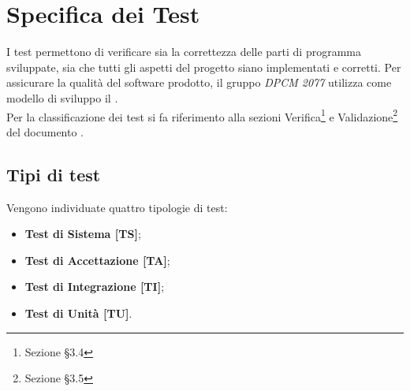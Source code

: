 
\section{Specifica dei Test}
I test permettono di verificare sia la correttezza delle parti di programma sviluppate, sia che tutti gli aspetti del progetto siano implementati e corretti.
Per assicurare la qualità del software prodotto, il gruppo \textit{DPCM 2077} utilizza come modello di sviluppo il .
\\
Per la classificazione dei test si fa riferimento alla sezioni Verifica\footnote{Sezione §3.4} e Validazione\footnote{Sezione §3.5} del documento .
	\subsection{Tipi di test}
	Vengono individuate quattro tipologie di test:
	\begin{itemize}
		\item \textbf{Test di Sistema [TS]};
		\item \textbf{Test di Accettazione [TA]};
		\item \textbf{Test di Integrazione [TI]};
		\item \textbf{Test di Unità [TU]}.
	\end{itemize}
